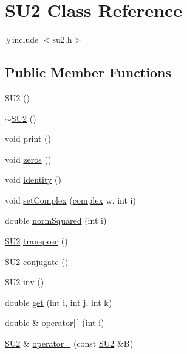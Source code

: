 \hypertarget{class_s_u2}{}\section{S\+U2 Class Reference}
\label{class_s_u2}


{\ttfamily \#include $<$su2.\+h$>$}

\subsection*{Public Member Functions}
\begin{DoxyCompactItemize}
\item 
\mbox{\hyperlink{class_s_u2_a681fd5c1304d6f160686d7e9c0842ecb}{S\+U2}} ()
\item 
\mbox{\hyperlink{class_s_u2_a966f54ae31784aba31580b4569d83e1f}{$\sim$\+S\+U2}} ()
\item 
void \mbox{\hyperlink{class_s_u2_a1210d531ef84574deb5f03dd24de80cf}{print}} ()
\item 
void \mbox{\hyperlink{class_s_u2_a348ca5d38346892060a05f7d9de02916}{zeros}} ()
\item 
void \mbox{\hyperlink{class_s_u2_a17ce46d1d9db179d045602b90b3d5af4}{identity}} ()
\item 
void \mbox{\hyperlink{class_s_u2_afe1d093aaf7325c1a7490f84e4c59b12}{set\+Complex}} (\mbox{\hyperlink{classcomplex}{complex}} w, int i)
\item 
double \mbox{\hyperlink{class_s_u2_ad1eebb9f268f569b888f1ae6ab6a7e6c}{norm\+Squared}} (int i)
\item 
\mbox{\hyperlink{class_s_u2}{S\+U2}} \mbox{\hyperlink{class_s_u2_a798389d4b2bc24cea6a466473004e3f8}{transpose}} ()
\item 
\mbox{\hyperlink{class_s_u2}{S\+U2}} \mbox{\hyperlink{class_s_u2_afb3a5fc8c00a45a0044113fb742727cc}{conjugate}} ()
\item 
\mbox{\hyperlink{class_s_u2}{S\+U2}} \mbox{\hyperlink{class_s_u2_a2f7f6ade28078418c8ee97234fff4dd0}{inv}} ()
\item 
double \mbox{\hyperlink{class_s_u2_a4f10c4617e00686b196653dd669e0697}{get}} (int i, int j, int k)
\item 
double \& \mbox{\hyperlink{class_s_u2_aa8dbfcb283189ab089c0b73007e08e7e}{operator\mbox{[}$\,$\mbox{]}}} (int i)
\item 
\mbox{\hyperlink{class_s_u2}{S\+U2}} \& \mbox{\hyperlink{class_s_u2_a6b3df2e42e824e6a5f9d312e16132aa2}{operator=}} (const \mbox{\hyperlink{class_s_u2}{S\+U2}} \&B)
\item 

\end{DoxyCompactItemize}
